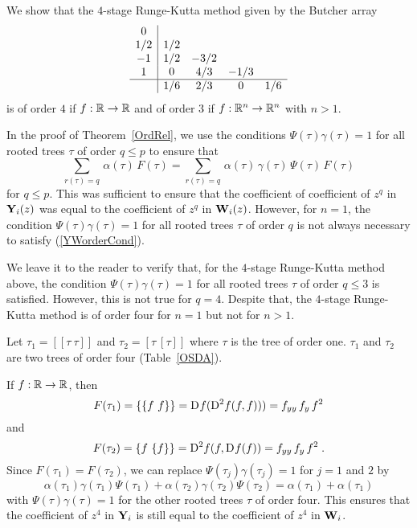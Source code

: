\begin{rmk}
We show that the $4$-stage Runge-Kutta method given by the
Butcher array 
\[
\begin{array}{c|ccccc}
0 & \\
1/2 & 1/2 \\
-1 & 1/2 & -3/2 \\
1 & 0 & 4/3 & -1/3 \\
\hline
 & 1/6 & 2/3 & 0 & 1/6
\end{array}
\]
is of order $4$ if $f:\RR \rightarrow \RR$ and of order $3$ if
$f:\RR^n\rightarrow\RR^n$ with $n>1$.

In the proof of Theorem~\ref{OrdRel}, we use the conditions
$\Psi(\tau)\gamma(\tau) = 1$ for all rooted trees $\tau$ of order
$q \leq p$ to ensure that
\begin{equation} \label{YWorderCond}
\sum_{r(\tau)=q}\,\alpha(\tau)\,F(\tau)
= \sum_{r(\tau)=q}\,\alpha(\tau)\,\gamma(\tau)\,\Psi(\tau)\,F(\tau)
\end{equation}
for $q \leq p$.  This was sufficient to ensure that the coefficient of 
coefficient of $z^q$ in $\VEC{Y}_i(z)$ was equal to the coefficient of
$z^q$ in $\VEC{W}_i(z)$.  However, for $n=1$, the condition
$\Psi(\tau)\gamma(\tau) = 1$ for all rooted trees $\tau$ of order $q$
is not always necessary to satisfy (\ref{YWorderCond}).

We leave it to the reader to verify that, for the $4$-stage
Runge-Kutta method above, the condition
$\Psi(\tau)\gamma(\tau) = 1$ for all rooted trees $\tau$ of order
$q \leq 3$ is satisfied.  However, this is not true for $q=4$.
Despite that, the $4$-stage Runge-Kutta method is of order four for
$n=1$ but not for $n>1$.

Let $\tau_1 = [[\tau\ \tau]]$ and $\tau_2 = [\tau\ [\tau]]$ where
$\tau$ is the tree of order one.  $\tau_1$ and $\tau_2$ are two
trees of order four (Table~\ref{OSDA}).

If $f:\RR\rightarrow\RR$, then
\[
F(\tau_1) = \{\{f\ f\}\} = \fdiff{f}{}(\fdiff{f}{2}(f,f))) =
f_{yy}\,f_y\,f^2
\]
and
\[
F(\tau_2) = \{f\ \{f\}\} = \fdiff{f}{2}(f,\fdiff{f}{}(f)) =
f_{yy}\,f_y\,f^2 \; .
\]
Since $F(\tau_1) = F(\tau_2)$, we can replace 
$\Psi(\tau_j)\gamma(\tau_j) = 1$ for $j=1$ and $2$ by
\[
\alpha(\tau_1)\gamma(\tau_1)\Psi(\tau_1) +
\alpha(\tau_2)\gamma(\tau_2)\Psi(\tau_2) = \alpha(\tau_1) +
\alpha(\tau_1)
\]
with $\Psi(\tau)\gamma(\tau) = 1$ for the other rooted trees $\tau$ of
order four.  This ensures that the coefficient of $z^4$ in
$\VEC{Y}_i$ is still equal to the coefficient of $z^4$ in $\VEC{W}_i$.


\end{rmk}
